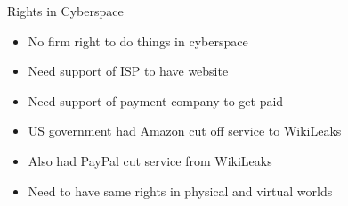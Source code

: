 \begin{frame}{Rights in Cyberspace}
  \begin{itemize}
    \item No firm right to do things in cyberspace
    \item Need support of ISP to have website
    \item Need support of payment company to get paid
    \item US government had Amazon cut off service to WikiLeaks
    \item Also had PayPal cut service from WikiLeaks
    \item Need to have same rights in physical and virtual worlds
  \end{itemize}
\end{frame}
